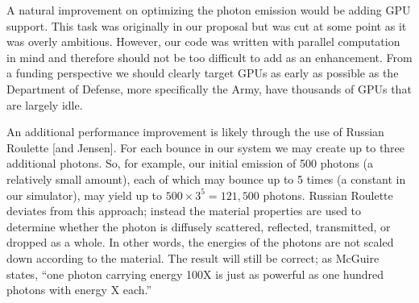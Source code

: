 \documentclass[%
        final,
        notitlepage,
        narroweqnarray,
        inline,
        twoside,
        ]{ieee}
\begin{document}
A natural improvement on optimizing the photon emission would be adding
GPU support.  This task was originally in our proposal but was cut at some
point as it was overly ambitious.  However, our code was written with
parallel computation in mind and therefore should not be too difficult to
add as an enhancement.  From a funding perspective we should clearly target
GPUs as early as possible as the Department of Defense, more specifically the
Army, have thousands of GPUs that are largely idle.

An additional performance improvement is likely through the use of
Russian Roulette \cite{Russian}[and Jensen].  For each bounce in our
system we may create up to three additional photons.  So, for example, our
initial emission of 500 photons (a relatively small amount), each of which may
bounce up to 5 times (a constant in our simulator), may yield up
to $500 \times 3^5 = 121,500$ photons.  Russian Roulette deviates from this
approach; instead the material properties are used to determine whether the
photon is diffusely scattered, reflected, transmitted, or dropped as a whole.
In other words, the energies of the photons are not scaled down according to
the material.  The result will still be correct; as McGuire states,
``one photon carrying energy 100X is just as powerful as one hundred photons
with energy X each.''  





\end{document}
